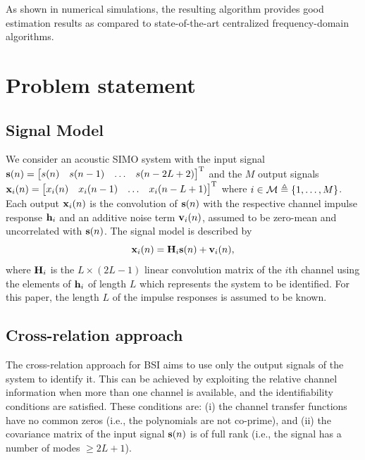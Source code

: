 \documentclass{article}
\begin{document}
As shown in numerical simulations, the resulting algorithm provides good estimation results as compared to state-of-the-art centralized frequency-domain algorithms.

\section{Problem statement}
\label{sec:problem_statement}

\subsection{Signal Model}
\label{ssec:signal_model}
We consider an acoustic SIMO system with the input signal \(\bm{\mathrm{s}}(n) = \begin{bmatrix}
    s(n)&s(n-1)&\ldots&s(n-2L+2)
\end{bmatrix}^{{\mathrm{T}}}\) and the \(M\) output signals \(\bm{\mathrm{x}}_i(n)= \begin{bmatrix}
    x_i(n)&x_i(n-1)&\ldots&x_i(n-L+1)
\end{bmatrix}^{{\mathrm{T}}}\)
where \(i \in \mathcal{M} \triangleq \{1, \ldots, M\} \).
Each output \(\bm{\mathrm{x}}_i(n)\) is the convolution of \(\bm{\mathrm{s}}(n)\) with the respective channel impulse response \(\bm{\mathrm{h}}_i\) and an additive noise term \(\bm{\mathrm{v}}_i(n)\), assumed to be zero-mean and uncorrelated with \(\bm{\mathrm{s}}(n)\).
The signal model is described by
\begin{equation}
    \bm{\mathrm{x}}_i(n) = \bm{\mathrm{H}}_i \bm{\mathrm{s}}(n) + \bm{\mathrm{v}}_i(n),
\end{equation}
where \(\bm{\mathrm{H}}_i\) is the \(L \times (2L-1)\) linear convolution matrix of the \(i\)th channel using the elements of \(\bm{\mathrm{h}}_i\) of length \(L\) which represents the system to be identified.
For this paper, the length \(L\) of the impulse responses is assumed to be known.

\subsection{Cross-relation approach}
\label{ssec:cross_rel}
The cross-relation approach for BSI aims to use only the output signals of the system to identify it.
This can be achieved by exploiting the relative channel information when more than one channel is available, and the identifiability conditions \cite{guanghanxuLeastsquaresApproachBlind1995} are satisfied. These conditions are: (i) the channel transfer functions have no common zeros (i.e., the polynomials are not co-prime), and (ii) the covariance matrix of the input signal \(\bm{\mathrm{s}}(n)\) is of full rank (i.e., the signal has a number of modes \(\geq 2L+1\)).
\end{document}
